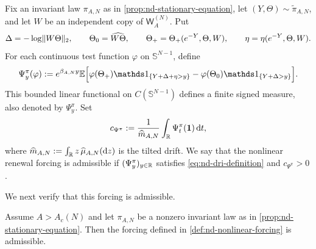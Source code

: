 \documentclass[11pt,reqno,a4paper]{article}
\newcommand{\Ee}{\E}
\begin{document}
\begin{definition}
\label{def:nd-nonlinear-forcing}
  Fix an invariant law $\pi_{A,N}$ as in
  \cref{prop:nd-stationary-equation}, let
  $(Y,\Theta)\sim\widetilde{\pi}_{A,N}$, and let $W$ be an independent copy of
  $\mathsf W_A^{(N)}$. Put
  \begin{equation*}
    \Delta=-\log\lVert W\Theta\rVert_2,\qquad
    \Theta_0=\widehat{W\Theta},\qquad
    \Theta_+=\Theta_+(e^{-Y},\Theta,W),\qquad
    \eta=\eta(e^{-Y},\Theta,W).
  \end{equation*}
  For each continuous test function $\varphi$ on $\mathbb S^{N-1}$, define
  \begin{equation}\label{eq:nd-forcing-definition}
    \Psi_y^\pi(\varphi)
    :=
    e^{\beta_{A,N}y}
    \Ee\Bigl[
      \varphi(\Theta_+)
      \one_{\{Y+\Delta+\eta>y\}}
      -
      \varphi(\Theta_0)
      \one_{\{Y+\Delta>y\}}
    \Bigr].
  \end{equation}
  This bounded linear functional on $C(\mathbb S^{N-1})$ defines a finite
  signed measure, also denoted by $\Psi_y^\pi$.
  Set
  \begin{equation}\label{eq:nd-forcing-constant}
    c_{\Psi^\pi}
    :=
    \frac{1}{\widehat m_{A,N}}
    \int_{\mathbb{R}} \Psi_t^\pi(\mathbf 1)\,\mathrm{d}t ,
  \end{equation}
  where $\widehat m_{A,N}:=\int_{\mathbb{R}} z\,\widehat\mu_{A,N}(\mathrm{d}z)$ is the
  tilted drift.
  We say that the nonlinear renewal forcing is admissible if
  $(\Psi_y^\pi)_{y\in\mathbb{R}}$ satisfies
  \cref{eq:nd-dri-definition} and $c_{\Psi^\pi}>0$.
\end{definition}

We next verify that this forcing is admissible.
\begin{proposition}
\label{prop:nd-forcing-admissibility}
  Assume $A>A_c(N)$ and let $\pi_{A,N}$ be a nonzero invariant law as in
  \cref{prop:nd-stationary-equation}. Then the forcing defined in
  \cref{def:nd-nonlinear-forcing} is admissible.
\end{proposition}
\end{document}
